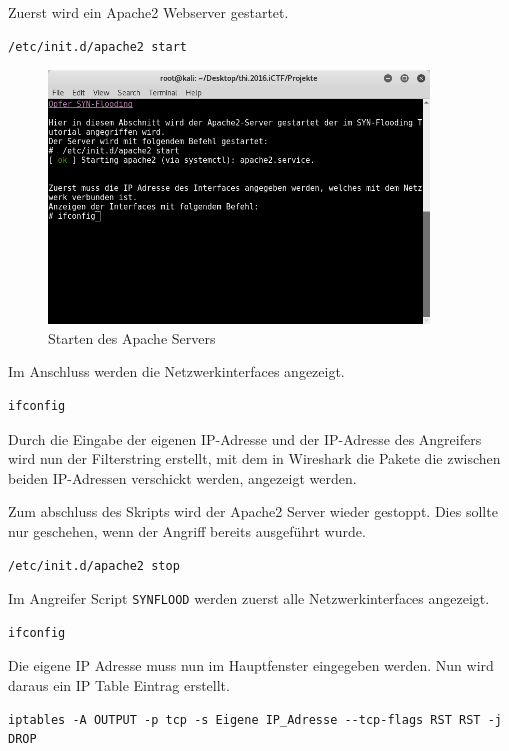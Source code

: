Zuerst wird ein Apache2 Webserver gestartet.
\begin{lstlisting}
/etc/init.d/apache2 start
\end{lstlisting}
	\begin{figure}[H]
		\centering
		\includegraphics[width=0.9\textwidth]{images/DOS/opfer_server_start.png}
		\caption{Starten des Apache Servers}
		\label{fig:start opfer apache}
	\end{figure}

Im Anschluss werden die Netzwerkinterfaces angezeigt.
\begin{lstlisting}
ifconfig
\end{lstlisting}

Durch die Eingabe der eigenen IP-Adresse und der IP-Adresse des Angreifers wird nun der Filterstring erstellt, mit dem in Wireshark die Pakete die zwischen beiden IP-Adressen verschickt werden, angezeigt werden.

Zum abschluss des Skripts wird der Apache2 Server wieder gestoppt. Dies sollte nur geschehen, wenn der Angriff bereits ausgeführt wurde.
\begin{lstlisting}
/etc/init.d/apache2 stop
\end{lstlisting}

\newpage Im Angreifer Script  \colorbox{altgray}{\lstinline|SYNFLOOD|} werden zuerst alle Netzwerkinterfaces angezeigt.
\begin{lstlisting}
ifconfig
\end{lstlisting}
Die eigene IP Adresse muss nun im Hauptfenster eingegeben werden. 
Nun wird daraus ein IP Table Eintrag erstellt.
\begin{lstlisting}
iptables -A OUTPUT -p tcp -s Eigene IP_Adresse --tcp-flags RST RST -j DROP
\end{lstlisting}

